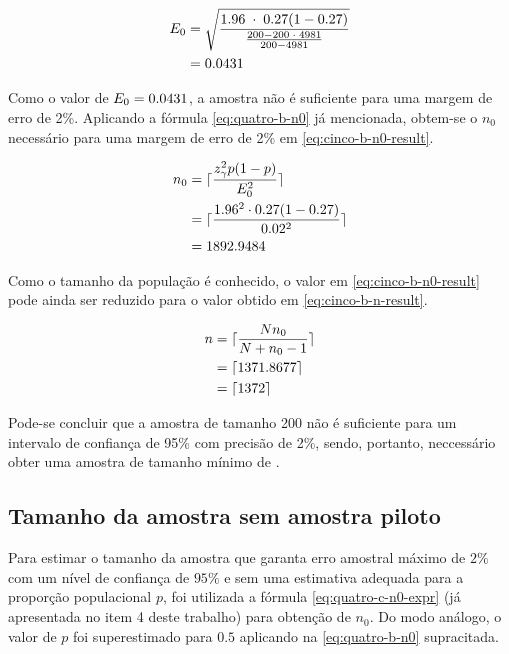 	\begin{align}
		\label{eq:cinco-b-e0-calc}
		E_0 &= \sqrt{\frac{1.96 \;\cdot\; 0.27 (1 - 0.27) }{\frac{200 - 200 \;\cdot\; 4981}{200 - 4981}}} \\
			&= 0.0431 \nonumber
	\end{align}

	Como o valor de $E_0 = 0.0431$, a amostra não é suficiente para uma
	margem de erro de 2\%. Aplicando a fórmula \eqref{eq:quatro-b-n0} já
	mencionada, obtem-se o $n_0$ necessário para uma margem de erro de 2\%
	em \eqref{eq:cinco-b-n0-result}.

	\begin{align}
		n_0 &= \lceil \frac{z_\gamma^2 p(1-p)}{E_0^2} \nonumber \rceil \\
			&= \lceil \frac{1.96^2 \cdot 0.27(1-0.27)}{0.02^2} \nonumber \rceil \\
			&= \label{eq:cinco-b-n0-result}
			   1892.9484	
	\end{align}

	Como o tamanho da população é conhecido, o valor em
	\eqref{eq:cinco-b-n0-result} pode ainda ser reduzido para o valor obtido
	em \eqref{eq:cinco-b-n-result}.

	\begin{align}
		n &= \lceil \frac{N n_0}{N + n_0 - 1} \nonumber \rceil \\
		  &= \lceil 1371.8677 \nonumber \rceil \\
		  &= \lceil \label{eq:cinco-b-n-result} 
			 1372 \rceil
	\end{align}

	Pode-se concluir que a amostra de tamanho 200 não é suficiente para um
	intervalo de confiança de 95\% com precisão de 2\%, sendo, portanto,
	neccessário obter uma amostra de tamanho mínimo de \CINCOBnceil.

\subsection{Tamanho da amostra sem amostra piloto}

	Para estimar o tamanho da amostra que garanta erro amostral máximo de
	$2\%$ com um nível de confiança de $95\%$ e sem uma estimativa adequada
	para a proporção populacional $p$, foi utilizada a fórmula
	\eqref{eq:quatro-c-n0-expr} (já apresentada no item 4 deste trabalho)
	para obtenção de $n_0$.  Do modo análogo, o valor de $p$ foi
	superestimado para $0.5$ aplicando na \autoref{eq:quatro-b-n0}
	supracitada.

